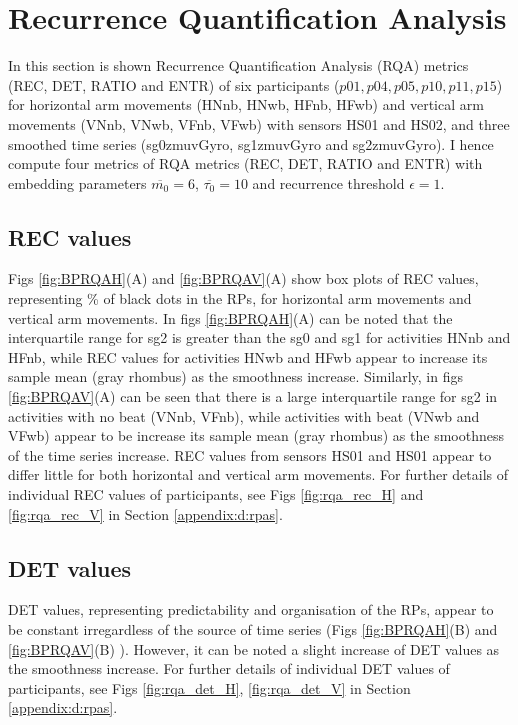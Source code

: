 \newpage
\section{Recurrence Quantification Analysis} \label{ch5:rqas}
In this section is shown Recurrence Quantification Analysis (RQA) metrics 
(REC, DET, RATIO and ENTR) of six participants ($p01, p04, p05, p10, p11, p15$)
for horizontal arm movements (HNnb, HNwb, HFnb, HFwb) 
and vertical arm movements (VNnb, VNwb, VFnb, VFwb)  
with sensors HS01 and HS02, and three smoothed time series 
(sg0zmuvGyro, sg1zmuvGyro and  sg2zmuvGyro).
I hence compute four metrics of RQA metrics (REC, DET, RATIO and ENTR) with 
embedding parameters $\overline{m_0}=6$, $\overline{\tau_0}=10$ and 
recurrence threshold $\epsilon=1$.
 
\subsection*{REC values}
Figs \ref{fig:BPRQAH}(A) and \ref{fig:BPRQAV}(A) 
show box plots of REC values, representing \% of black 
dots in the RPs, for horizontal arm movements and 
vertical arm movements. 
In figs \ref{fig:BPRQAH}(A) can be noted that the interquartile range for sg2 
is greater than the sg0 and sg1 for activities HNnb and HFnb, while
REC values for activities HNwb and HFwb appear to increase 
its sample mean (gray rhombus) as the smoothness increase.
Similarly, in figs \ref{fig:BPRQAV}(A) can be seen that there is a large 
interquartile range for sg2 in activities with no beat (VNnb, VFnb), while
activities with beat (VNwb and VFwb) appear to be increase its sample
mean (gray rhombus) as the smoothness of the time series increase. 
REC values from sensors HS01 and HS01 appear to differ little 
for both horizontal and vertical arm movements. 
For further details of individual REC values of participants, see 
Figs \ref{fig:rqa_rec_H} and \ref{fig:rqa_rec_V} in 
Section \ref{appendix:d:rpas}.

\subsection*{DET values}
DET values, representing predictability and organisation of the RPs, appear
to be constant irregardless of the source of time series 
(Figs \ref{fig:BPRQAH}(B) and \ref{fig:BPRQAV}(B) ).
However, it can be noted a slight increase of DET values as the 
smoothness increase.
For further details of individual DET values of participants, see 
Figs \ref{fig:rqa_det_H}, \ref{fig:rqa_det_V} in
Section \ref{appendix:d:rpas}.

